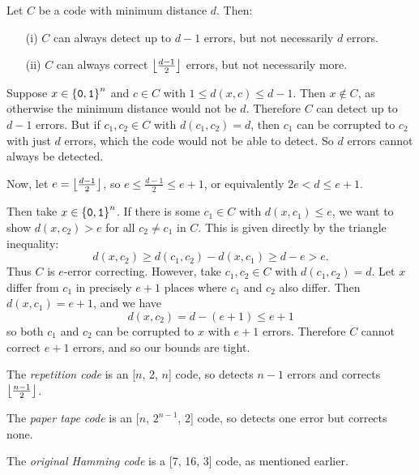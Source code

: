 \documentclass{article}
\begin{document}
\begin{proposition}
    Let $C$ be a code with minimum distance $d$. Then:
    \begin{enumerate}
    	\item[(i)] $C$ can always detect up to $d-1$ errors, but not necessarily $d$ errors.
    	\item[(ii)] $C$ can always correct $\left\lfloor\frac{d-1}{2}\right\rfloor$ errors, but not necessarily more.
	\end{enumerate}
\end{proposition}
\begin{prf}
    Suppose $x \in \left\lbrace \texttt{0}, \texttt{1} \right\rbrace^n$ and $c \in C$ with $1 \leq d(x, c) \leq d-1$. Then $x \notin C$, as otherwise the minimum distance would not be $d$. Therefore $C$ can detect up to $d-1$ errors. But if $c_1, c_2 \in C$ with $d(c_1, c_2) = d$, then $c_1$ can be corrupted to $c_2$ with just $d$ errors, which the code would not be able to detect. So $d$ errors cannot always be detected.
    
    Now, let $e = \left\lfloor\frac{d-1}{2}\right\rfloor$, so $e \leq \frac{d-1}{2} \leq e+1$, or equivalently $2e < d \leq e+1$.
    
    Then take $x \in \left\lbrace \texttt{0}, \texttt{1} \right\rbrace^n$. If there is some $c_1 \in C$ with $d(x, c_1) \leq e$, we want to show $d(x, c_2) > e$ for all $c_2 \neq c_1$ in $C$. This is given directly by the triangle inequality:
    \[
	d(x, c_2) \geq d(c_1, c_2) - d(x, c_1) \geq d-e > e.
	\]
	Thus $C$ is $e$-error correcting. However, take $c_1, c_2 \in C$ with $d(c_1, c_2) = d$. Let $x$ differ from $c_1$ in precisely $e+1$ places where $c_1$ and $c_2$ also differ. Then $d(x, c_1) = e+1$, and we have
	\[
	d(x, c_2) = d - (e+1) \leq e+1
	\]
	so both $c_1$ and $c_2$ can be corrupted to $x$ with $e+1$ errors. Therefore $C$ cannot correct $e+1$ errors, and so our bounds are tight.
\end{prf}

\begin{corollary}
    The \textit{repetition code} is an [$n$, 2, $n$] code, so detects $n-1$ errors and corrects $\left\lfloor\frac{n-1}{2}\right\rfloor$.
\end{corollary}

\begin{corollary}
    The \textit{paper tape code} is an [$n$, $2^{n-1}$, $2$] code, so detects one error but corrects none.
\end{corollary}

\begin{corollary}
    The \textit{original Hamming code} is a [7, 16, 3] code, as mentioned earlier.
\end{corollary}
\end{document}
